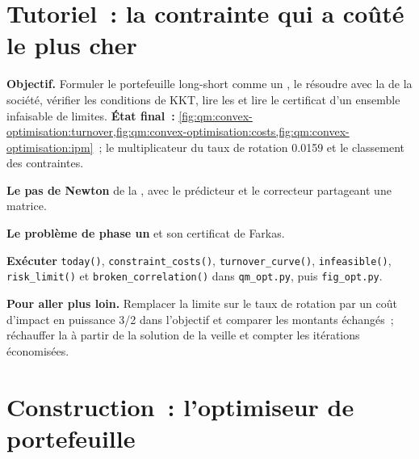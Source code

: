 \section{Tutoriel~: la contrainte qui a coûté le plus cher}\label{tut:qm:convex-optimisation:shadow}

\begin{tutorial}
\textbf{Objectif.} Formuler le portefeuille long-short comme un , le résoudre avec la  de la société, vérifier les conditions de KKT, lire les  et lire le
certificat d'un ensemble infaisable de limites.
\textbf{État final~:} \cref{fig:qm:convex-optimisation:turnover,fig:qm:convex-optimisation:costs,fig:qm:convex-optimisation:ipm}~; le multiplicateur du taux de rotation 0.0159 et le classement des
contraintes.
\begin{tutsteps}
\item \textbf{Le pas de Newton} de la , avec le prédicteur et le correcteur partageant une matrice.
\label{lst:qm:convex-optimisation:ipm}
\item \textbf{Le problème de phase un} et son certificat de Farkas.
\label{lst:qm:convex-optimisation:farkas}
\item \textbf{Exécuter} \texttt{today()}, \texttt{constraint\_costs()}, \texttt{turnover\_curve()}, \texttt{infeasible()}, \texttt{risk\_limit()} et \texttt{broken\_correlation()} dans
\texttt{qm\_opt.py}, puis \texttt{fig\_opt.py}.
\end{tutsteps}
\textbf{Pour aller plus loin.} Remplacer la limite sur le taux de rotation par un coût d'impact en puissance 3/2 dans l'objectif et comparer les montants échangés~; réchauffer la  à partir de la solution de la veille
et compter les itérations économisées.
\end{tutorial}

\section{Construction~: l'optimiseur de portefeuille}\label{bld:qm:convex-optimisation:portopt}

